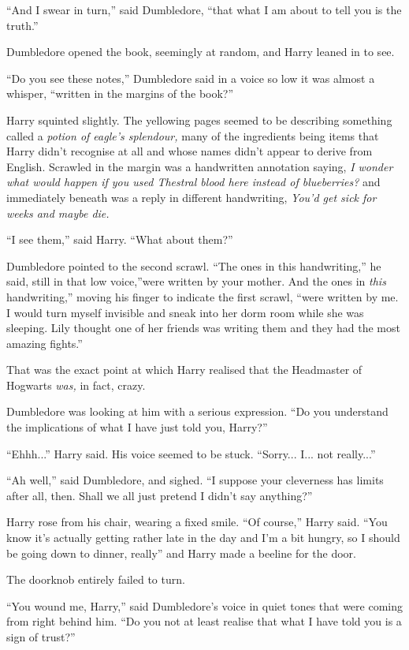 ``And I swear in turn,'' said Dumbledore, ``that what I am about to tell
you is the truth.''

Dumbledore opened the book, seemingly at random, and Harry leaned in to
see.

``Do you see these notes,'' Dumbledore said in a voice so low it was
almost a whisper, ``written in the margins of the book?''

Harry squinted slightly. The yellowing pages seemed to be describing
something called a \emph{potion of eagle's splendour,} many of the
ingredients being items that Harry didn't recognise at all and whose
names didn't appear to derive from English. Scrawled in the margin was a
handwritten annotation saying, \emph{I wonder what would happen if you
used Thestral blood here instead of blueberries?} and immediately
beneath was a reply in different handwriting, \emph{You'd get sick for
weeks and maybe die.}

``I see them,'' said Harry. ``What about them?''

Dumbledore pointed to the second scrawl. ``The ones in this
handwriting,'' he said, still in that low voice,''were written by your
mother. And the ones in \emph{this} handwriting,'' moving his finger to
indicate the first scrawl, ``were written by me. I would turn myself
invisible and sneak into her dorm room while she was sleeping. Lily
thought one of her friends was writing them and they had the most
amazing fights.''

That was the exact point at which Harry realised that the Headmaster of
Hogwarts \emph{was,} in fact, crazy.

Dumbledore was looking at him with a serious expression. ``Do you
understand the implications of what I have just told you, Harry?''

``Ehhh...'' Harry said. His voice seemed to be stuck.
``Sorry... I... not really...''

``Ah well,'' said Dumbledore, and sighed. ``I suppose your cleverness
has limits after all, then. Shall we all just pretend I didn't say
anything?''

Harry rose from his chair, wearing a fixed smile. ``Of course,'' Harry
said. ``You know it's actually getting rather late in the day and I'm a
bit hungry, so I should be going down to dinner, really'' and Harry made
a beeline for the door.

The doorknob entirely failed to turn.

``You wound me, Harry,'' said Dumbledore's voice in quiet tones that
were coming from right behind him. ``Do you not at least realise that
what I have told you is a sign of trust?''

